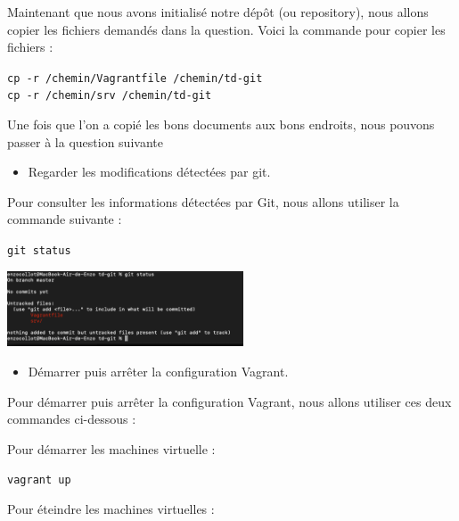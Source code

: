 \documentclass[12pt]{article}
\begin{document}
Maintenant que nous avons initialisé notre dépôt (ou repository), nous allons copier les fichiers demandés dans la question. Voici la commande pour copier les fichiers :

\texttt{cp -r /chemin/Vagrantfile /chemin/td-git} \\
\texttt{cp -r /chemin/srv /chemin/td-git}

\vspace{0.3cm}

Une fois que l'on a copié les bons documents aux bons endroits, nous pouvons passer à la question suivante 

\vspace{0.3cm}

\begin{itemize}
  \item Regarder les modifications détectées par git.
\end{itemize}

\vspace{0.3cm}

Pour consulter les informations détectées par Git, nous allons utiliser la commande suivante :

\texttt{git status}

\vspace{0.3cm}

\begin{center}
  \includegraphics[width=7cm]{Images-TD-Git/Image-TD-Git-1/git-status.png}
\end{center}

\vspace{0.3cm}

\begin{itemize}
  \item Démarrer puis arrêter la configuration Vagrant.
\end{itemize}

Pour démarrer puis arrêter la configuration Vagrant, nous allons utiliser ces deux commandes ci-dessous : \newline

Pour démarrer les machines virtuelle : 

\texttt{vagrant up}

Pour éteindre les machines virtuelles : 
\end{document}
